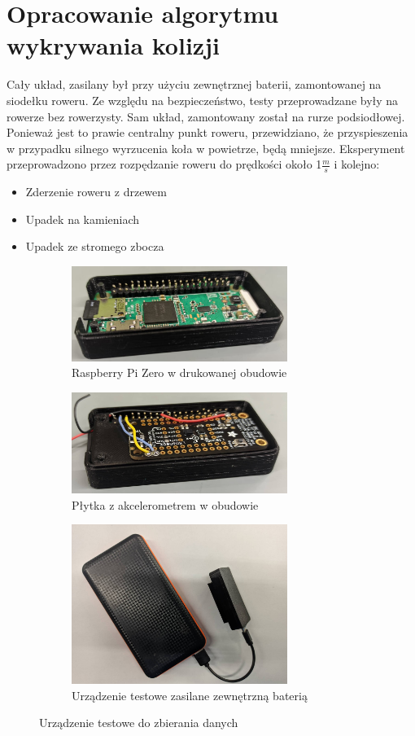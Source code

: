 \section{Opracowanie algorytmu wykrywania kolizji}
Cały układ, zasilany był przy użyciu zewnętrznej baterii, zamontowanej na siodełku roweru. Ze względu na bezpieczeństwo, testy przeprowadzane były na rowerze bez rowerzysty. Sam układ, zamontowany został na rurze podsiodłowej. Ponieważ jest to prawie centralny punkt roweru, przewidziano, że przyspieszenia w przypadku silnego wyrzucenia koła w powietrze, będą mniejsze. Eksperyment przeprowadzono przez rozpędzanie roweru do  prędkości około 1$\frac{m}{s}$ i kolejno:
\begin{itemize}
    \item Zderzenie roweru z drzewem
    \item Upadek na kamieniach
    \item Upadek ze stromego zbocza
\end{itemize}
\begin{figure}[h]
    \centering
    \begin{subfigure}{3.5cm}
        \includegraphics[width=7cm, angle=-90]{Graphics/pi.jpg}
        \caption{Raspberry Pi Zero w drukowanej obudowie}
        \label{img:test_device_a}
    \end{subfigure}
    \begin{subfigure}{3.5cm}
        \includegraphics[width=7cm, angle=-90]{Graphics/Pi_acc.jpg}
        \caption{Płytka z akcelerometrem w obudowie}
        \label{img:test_device_b}
    \end{subfigure}
    \begin{subfigure}{3.5cm}
        \includegraphics[width=7cm, angle=-90]{Graphics/test_device.jpg}
        \caption{Urządzenie testowe zasilane zewnętrzną baterią}
        \label{img:test_device_c}
    \end{subfigure}
    \caption{Urządzenie testowe do zbierania danych}
\end{figure}

